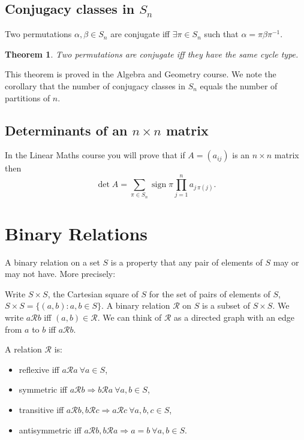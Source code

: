 \documentclass{notes}
\theoremstyle{plain}
\newtheorem{theorem}{Theorem}[chapter]
\newcommand{\rel}{\mathrel{\mathcal{R}}}
\newcommand{\relset}{\mathcal{R}}
\DeclareMathOperator{\sign}{sign}
\begin{document}
\subsection{Conjugacy classes in $S_n$}

Two permutations $\alpha, \beta \in S_n$ are conjugate iff $\exists \pi
\in S_n$ such that $\alpha = \pi \beta \pi^{-1}$.

\begin{theorem}
Two permutations are conjugate iff they have the same cycle type.
\end{theorem}

This theorem is proved in the Algebra and Geometry course.  We note the
corollary that the number of conjugacy classes in $S_n$ equals the number
of partitions of $n$.

\subsection{Determinants of an $n \times n$ matrix}

In the Linear Maths course you will prove that if $A = (a_{ij})$ is an
$n \times n$ matrix then
\[
\det A = \sum_{\pi \in S_n} \sign \pi \prod_{j=1}^n a_{j\, \pi(j)}.
\]

\section{Binary Relations}

A binary relation on a set $S$ is a property that any pair of elements
of $S$ may or may not have.  More precisely:

Write $S \times S$, the Cartesian square of $S$ for the set of pairs
of elements of $S$, $S \times S = \{ (a,b) : a,b \in S \}$.  A binary
relation $\relset$ on $S$ is a subset of $S \times S$.  We write $a \rel b$
iff $(a,b) \in \relset$.  We can think of $\relset$ as a directed graph
with an edge from $a$ to $b$ iff $a \rel b$.

A relation $\relset$ is:

\begin{itemize}
\item reflexive iff $a \rel a\ \forall a \in S$,
\item symmetric iff $a \rel b \Rightarrow b \rel a\ \forall a,b \in S$,
\item transitive iff $a \rel b, b \rel c \Rightarrow a \rel c\ \forall
a,b,c \in S$,
\item antisymmetric iff $a \rel b, b \rel a \Rightarrow a = b\ \forall
a,b \in S$.
\end{itemize}
\end{document}

